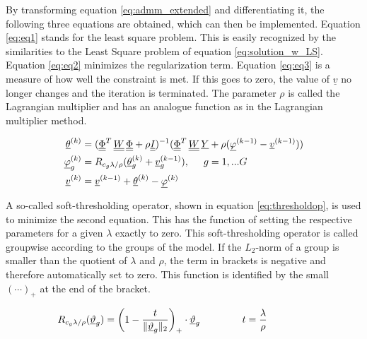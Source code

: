 By transforming equation \ref{eq:admm_extended} and differentiating it, the following three equations are obtained, which can then be implemented. Equation \ref{eq:eq1} stands for the least square problem. This is easily recognized by the similarities to the Least Square problem of equation \ref{eq:solution_w_LS}. Equation \ref{eq:eq2} minimizes the regularization term. Equation \ref{eq:eq3} is a measure of how well the constraint is met. If this goes to zero, the value of $\underline{v}$ no longer changes and the iteration is terminated. The parameter $\rho$ is called the Lagrangian multiplier and has an analogue function as in the Lagrangian multiplier method.


\begin{align}
	\underline{\theta}^{(k)} &= (\underline{\underline{\Phi}}^T \, \underline{\underline{W}} \, \underline{\underline{\Phi}} + \rho \underline{\underline{I}})^{-1}(\underline{\underline{\Phi}}^T \, \underline{\underline{W}} \, \underline{Y} + \rho (\underline{\varphi}^{(k-1)}-\underline{v}^{(k-1)})) \label{eq:eq1} \\ 
	\underline{\varphi}^{(k)}_g &= R_{c_g \lambda/ \rho}(\underline{\theta}_g^{(k)}+\underline{v}_g^{(k-1)}), \hspace{0.5cm} g= 1,...G  \label{eq:eq2} \\ 
	\underline{v}^{(k)} &= \underline{v}^{(k-1)}+ \underline{\theta}^{(k)}-\underline{\varphi}^{(k)}
	\label{eq:eq3}
\end{align}

A so-called soft-thresholding operator, shown in equation \ref{eq:thresholdop}, is used to minimize the second equation. This has the function of setting the respective parameters for a given $\lambda$ exactly to zero. This soft-thresholding operator  is called groupwise according to the groups of the model. If the $L_2$-norm of a group is smaller than the quotient of $\lambda$ and $\rho$, the term in brackets is negative and therefore automatically set to zero. This function is identified by the small $(\cdots)_+$ at the end of the bracket.


 \begin{equation}
	R_{c_g \lambda/ \rho}(\underline{\vartheta}_g) =\biggl( 1-\frac{t}{\Vert \underline{\vartheta}_g \Vert_2}\biggr)_+  \cdot\underline{\vartheta}_g \hspace{1.5cm} t=\frac{\lambda}{\rho} \hspace{1.5cm}
	\label{eq:thresholdop}
\end{equation}

